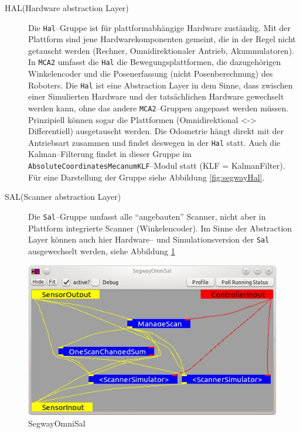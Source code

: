 \begin{description}
\item[HAL(Hardware abstraction Layer)] Die \lstinline{Hal}--Gruppe ist für
 plattformabhängige Hardware zuständig.
 Mit der Plattform sind jene Hardwarekomponenten gemeint, die in der Regel nicht getauscht werden 
 (Rechner, Omnidirektionaler Antrieb, Akummulatoren).
 In \lstinline{MCA2} umfasst die \lstinline{Hal} die Bewegungsplattformen, die dazugehörigen
 Winkelencoder und die Posenerfassung (nicht Posenberechnung) des Roboters. Die \lstinline{Hal} ist eine Abstraction Layer in dem Sinne, dass zwischen einer Simulierten
 Hardware und der tatsächlichen Hardware gewechselt werden kann, ohne das andere
 \lstinline{MCA2}--Gruppen angepasst werden müssen.
 Prinzipiell können sogar die Plattformen (Omnidirektional <-> Differentiell) ausgetauscht werden. Die Odometrie hängt
 direkt mit der Antriebsart zusammen und findet deswegen in der \lstinline{Hal} statt.
 Auch die Kalman--Filterung findet in dieser Gruppe im
 \lstinline{AbsoluteCoordinatesMecanumKLF}--Modul statt (KLF = KalmanFilter). Für
 eine Darstellung der Gruppe siehe Abbildung \ref{fig:segwayHal}.
\item[SAL(Scanner abstraction Layer)] Die \lstinline{Sal}--Gruppe umfasst alle ``angebauten''
Scanner, nicht aber in Plattform integrierte Scanner (Winkelencoder).
 Im Sinne der Abstraction Layer können auch hier Hardware-- und
 Simulationsversion der \lstinline{Sal} ausgewechselt werden, siehe Abbildung
 \ref{fig:SegwayOmniSal}
\end{description}
\begin{figure}[h]
\center
\includegraphics[scale=0.7]{graphics/SegwayOmniSal.jpg}
\caption{\label{fig:SegwayOmniSal} SegwayOmniSal}
\end{figure}

